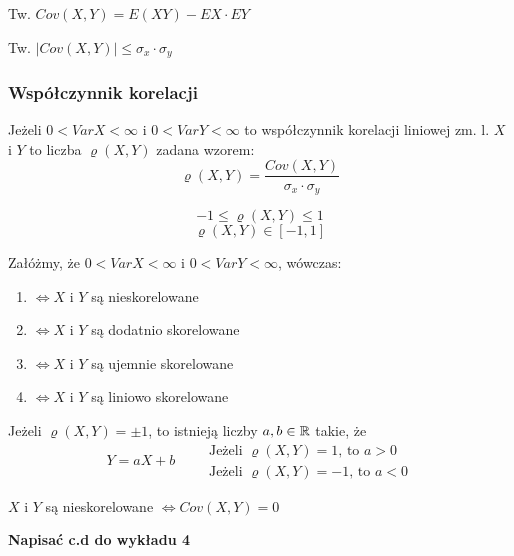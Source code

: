 \documentclass[../Matematyka.tex]{subfiles}
\begin{document}
Tw. \(Cov(X,Y) = E(XY) - EX \cdot EY\)

Tw. \(|Cov(X,Y)| \leq \sigma_x \cdot \sigma_y\)

\subsubsection*{Współczynnik korelacji}
Jeżeli \(0 < VarX < \infty\) i \(0 < VarY < \infty\) to współczynnik korelacji liniowej zm. l. \(X\) i \(Y\) to liczba \(\varrho(X,Y)\) zadana wzorem:
\[\varrho(X,Y) = \frac{Cov(X,Y)}{\sigma_x \cdot \sigma_y}\]

\[-1 \leq \varrho(X,Y) \leq 1\]
\[\varrho(X,Y) \in [-1,1]\]

Załóżmy, że \(0 < VarX < \infty\) i \(0 < VarY < \infty\), wówczas:
\begin{enumerate}[label=(\roman*)]
    \item {} \(\iff X\) i \(Y\) są nieskorelowane
    \item {} \(\iff X\) i \(Y\) są dodatnio skorelowane
    \item {} \(\iff X\) i \(Y\) są ujemnie skorelowane
    \item {} \(\iff X\) i \(Y\) są liniowo skorelowane
\end{enumerate}

Jeżeli \(\varrho(X,Y) = \pm 1\), to istnieją liczby \(a, b \in \mathbb{R}\) takie, że
\[Y = aX + b \qquad 
\substack{
    \text{Jeżeli } \varrho(X,Y) = 1 \text{, to } a > 0\\
    \text{Jeżeli } \varrho(X,Y) = -1 \text{, to } a < 0
}\]

\(X\) i \(Y\) są nieskorelowane \(\iff Cov(X,Y) = 0\)

{\huge \bf{Napisać c.d do wykładu 4}}
\end{document}
